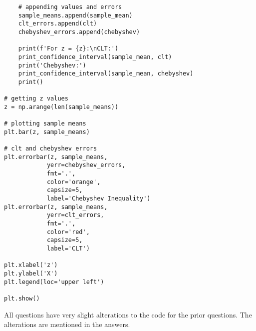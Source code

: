 \documentclass{oxmathproblems}
\begin{document}
\begin{questions}
\begin{parts}
\begin{verbatim}
    # appending values and errors
    sample_means.append(sample_mean)
    clt_errors.append(clt)
    chebyshev_errors.append(chebyshev)

    print(f'For z = {z}:\nCLT:')
    print_confidence_interval(sample_mean, clt)
    print('Chebyshev:')
    print_confidence_interval(sample_mean, chebyshev)
    print()

# getting z values
z = np.arange(len(sample_means))

# plotting sample means
plt.bar(z, sample_means)

# clt and chebyshev errors
plt.errorbar(z, sample_means, 
            yerr=chebyshev_errors, 
            fmt='.', 
            color='orange', 
            capsize=5, 
            label='Chebyshev Inequality')
plt.errorbar(z, sample_means, 
            yerr=clt_errors, 
            fmt='.', 
            color='red', 
            capsize=5, 
            label='CLT')

plt.xlabel('z')
plt.ylabel('X')
plt.legend(loc='upper left')

plt.show()
\end{verbatim}
\end{parts}

\miquestion
All questions have very slight alterations to the code for the prior questions. The alterations are mentioned in the answers.

\end{questions}
\end{document}

